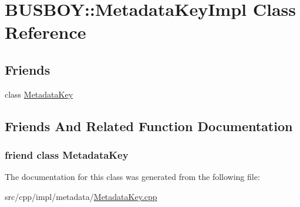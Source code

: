 \hypertarget{classBUSBOY_1_1MetadataKeyImpl}{
\section{BUSBOY::MetadataKeyImpl Class Reference}
\label{classBUSBOY_1_1MetadataKeyImpl}
}
\subsection*{Friends}
\begin{DoxyCompactItemize}
\item 
class \hyperlink{classBUSBOY_1_1MetadataKeyImpl_a1183fd1d77ef39c1ea8ab8b3b7f855a7}{MetadataKey}
\end{DoxyCompactItemize}


\subsection{Friends And Related Function Documentation}
\hypertarget{classBUSBOY_1_1MetadataKeyImpl_a1183fd1d77ef39c1ea8ab8b3b7f855a7}{
\subsubsection[{MetadataKey}]{\setlength{\rightskip}{0pt plus 5cm}friend class {\bf MetadataKey}}}
\label{classBUSBOY_1_1MetadataKeyImpl_a1183fd1d77ef39c1ea8ab8b3b7f855a7}


The documentation for this class was generated from the following file:\begin{DoxyCompactItemize}
\item 
src/cpp/impl/metadata/\hyperlink{MetadataKey_8cpp}{MetadataKey.cpp}\end{DoxyCompactItemize}
